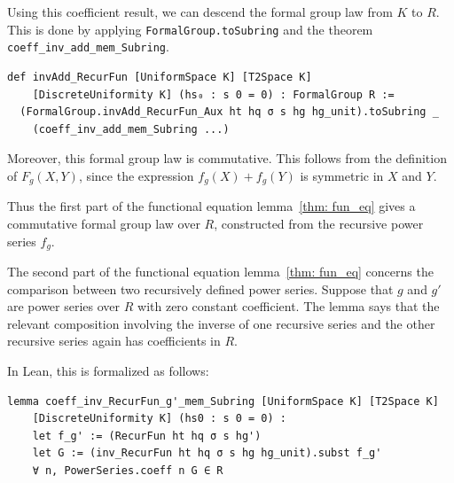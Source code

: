 


Using this coefficient result, we can descend the formal group law from
$K$ to $R$.  This is done by applying \lstinline|FormalGroup.toSubring|
and the theorem \lstinline|coeff_inv_add_mem_Subring|.

\begin{lstlisting}
def invAdd_RecurFun [UniformSpace K] [T2Space K]
    [DiscreteUniformity K] (hs₀ : s 0 = 0) : FormalGroup R :=
  (FormalGroup.invAdd_RecurFun_Aux ht hq σ s hg hg_unit).toSubring _
    (coeff_inv_add_mem_Subring ...)
\end{lstlisting}

Moreover, this formal group law is commutative.  This follows from the
definition of $F_g(X,Y)$, since the expression
$f_g(X) + f_g(Y)$ is symmetric in $X$ and $Y$.

Thus the first part of the functional equation lemma~\ref{thm: fun_eq}
gives a commutative formal group law over $R$, constructed from
the recursive power series $f_g$.

The second part of the functional equation lemma~\ref{thm: fun_eq}
concerns the comparison between two recursively defined power series.
Suppose that $g$ and $g'$ are power series over $R$ with zero constant
coefficient.  The lemma says that the relevant composition involving the
inverse of one recursive series and the other recursive series again has
coefficients in $R$.

In Lean, this is formalized as follows:

\begin{lstlisting}
lemma coeff_inv_RecurFun_g'_mem_Subring [UniformSpace K] [T2Space K]
    [DiscreteUniformity K] (hs0 : s 0 = 0) :
    let f_g' := (RecurFun ht hq σ s hg')
    let G := (inv_RecurFun ht hq σ s hg hg_unit).subst f_g'
    ∀ n, PowerSeries.coeff n G ∈ R
\end{lstlisting}

